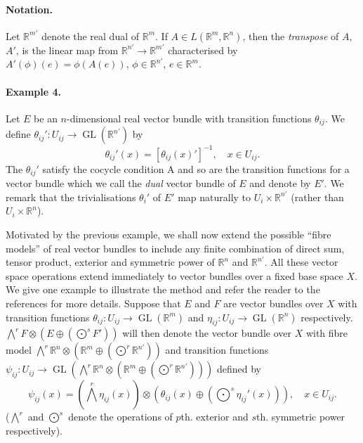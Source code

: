 \paragraph*{Notation.} Let $\mathbb R^{m\prime}$ denote the real dual of $\mathbb R^m$. If $A\in L(\mathbb R^m,\mathbb R^n)$, then the \emph{transpose} of $A$, $A'$, is the linear map from $\mathbb R^{n\prime}\to\mathbb R^{m\prime}$ characterised by $A'(\phi)(e)=\phi(A(e))$, $\phi\in\mathbb R^{n\prime}$, $e\in\mathbb R^m$.

\paragraph*{Example 4.} Let $E$ be an $n$-dimensional real vector bundle with transition functions $\theta_{ij}$. We define $\theta_{ij}':U_{ij}\to\operatorname{GL}(\mathbb R^{n\prime})$ by
\[ \theta_{ij}'(x)=[\theta_{ij}(x)']^{-1},\quad x\in U_{ij}. \]
The $\theta_{ij}'$ satisfy the cocycle condition A and so are the transition functions for a vector bundle which we call the \emph{dual} vector bundle of $E$ and denote by $E'$. We remark that the trivialisations $\theta_i'$ of $E'$ map naturally to $U_i\times\mathbb R^{n\prime}$ (rather than $U_i\times\mathbb R^n$).

Motivated by the previous example, we shall now extend the possible ``fibre models'' of real vector bundles to include any finite combination of direct sum, tensor product, exterior and symmetric power of $\mathbb R^n$ and $\mathbb R^{n\prime}$. All these vector space operations extend immediately to vector bundles over a fixed base space $X$. We give one example to illustrate the method and refer the reader to the references for more details. Suppose that $E$ and $F$ are vector bundles over $X$ with transition functions $\theta_{ij}:U_{ij}\to\operatorname{GL}(\mathbb R^m)$ and $\eta_{ij}:U_{ij}\to\operatorname{GL}(\mathbb R^n)$ respectively. $\bigwedge^r F\otimes(E\oplus(\bigodot^s F'))$ will then denote the vector bundle over $X$ with fibre model $\bigwedge^r\mathbb R^n\otimes(\mathbb R^m\oplus(\bigodot^r\mathbb R^{n\prime}))$ and transition functions $\psi_{ij}:U_{ij}\to\operatorname{GL}(\bigwedge^r\mathbb R^n\otimes(\mathbb R^m\oplus(\bigodot^r\mathbb R^{n\prime})))$ defined by
\[ \psi_{ij}(x)=(\bigwedge^r\eta_{ij}(x))\otimes(\theta_{ij}(x)\oplus(\bigodot^s\eta_{ij}'(x))),\quad x\in U_{ij}. \]
($\bigwedge^r$ and $\bigodot^s$ denote the operations of $p$th. exterior and $s$th. symmetric power respectively).


